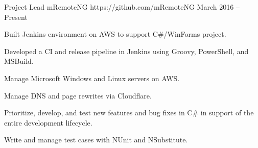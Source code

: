 \cventry
{Project Lead} %
{mRemoteNG} %
{https://github.com/mRemoteNG} %
{March 2016 – Present} %
{
  	\begin{cvitems} %
        \item {Built Jenkins environment on AWS to support C\#/WinForms project.}
		\item {Developed a CI and release pipeline in Jenkins using Groovy, PowerShell, and MSBuild.}
		\item {Manage Microsoft Windows and Linux servers on AWS.}
		\item {Manage DNS and page rewrites via Cloudflare.}
		\item {Prioritize, develop, and test new features and bug fixes in C\# in support of the entire development lifecycle.}
		\item {Write and manage test cases with NUnit and NSubstitute.}
	\end{cvitems}
}